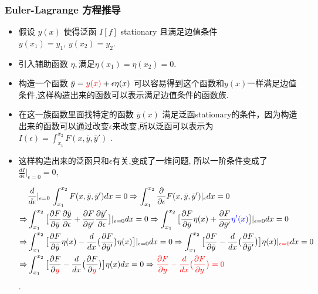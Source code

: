 \documentclass[UTF8, aspectratio=169, 9pt]{ctexbeamer}
\begin{document}
\begin{frame}
  \frametitle{Euler-Lagrange 方程推导}
  \begin{itemize}
  \item 假设 $y(x)$ 使得泛函 $I[f]$ stationary 且满足边值条件 $y(x_1) = y_1, \, y(x_2) = y_2$.
  \item 引入辅助函数 $\eta, 满足 \eta (x_1) = \eta (x_2) = 0$.
  \item 构造一个函数 $\bar{y} = \textcolor{red} {y(x)} + \epsilon \eta(x)$ 可以容易得到这个函数和$y(x)$一样满足边值条件,这样构造出来的函数可以表示满足边值条件的函数族.
  \item 在这一族函数里面找特定的函数 $\bar{y} (x)$ 满足泛函stationary的条件，因为构造出来的函数可以通过改变$\epsilon$来改变,所以泛函可以表示为 $I( \epsilon ) =
    \int_{x_1}^{x_2} F( x, \bar{y}, \bar{y}' )$ .
  \item 这样构造出来的泛函只和$\epsilon$有关,变成了一维问题, 所以一阶条件变成了
    $\frac{dI}{d \epsilon} |_{\epsilon = 0} = 0$,

    \begin{align}
      \begin{split}
        & \frac{d}{d \epsilon} |_{\epsilon = 0} \, \int_{x_1}^{x_2} F(x,
        \bar{y}, \bar{y}' ) dx = 0 \Rightarrow \int_{x_1}^{x_2}
        \frac{\partial}{\partial
          \epsilon} F( x, \bar{y}, \bar{y}' ) |_{\epsilon} dx = 0 \\
        \Rightarrow & \int_{x_1}^{x_2} \big [ \frac{ \partial F }{ \partial
          \bar{y} } \frac{ \partial \bar{y} }{ \partial \epsilon } + \frac{
          \partial F }{ \partial \bar{y}' } \frac{ \partial \bar{y}' }{ \partial
          \epsilon } \big ] |_{\epsilon=0} dx = 0
        \Rightarrow  \int_{x_1}^{x_2} \big [ \frac{ \partial F }{ \partial
          \bar{y} } \eta (x) + \frac{
          \partial F }{ \partial \bar{y}' } \textcolor {blue} {\eta'(x)} \big ] |_{\epsilon=0} dx =
        0 \\
        \Rightarrow & \int_{x_1}^{x_2} \big [ \frac{ \partial F }{ \partial
          \bar{y} } \eta (x) - \frac{d}{dx} \big ( \frac{
          \partial F }{ \partial \bar{y}' } \big ) \eta(x) \big ] |_{\epsilon=0} dx =
        0
        \Rightarrow  \int_{x_1}^{x_2} \big [ \frac{ \partial F }{ \partial
          \bar{y} }  - \frac{d}{dx} \big ( \frac{
          \partial F }{ \partial \bar{y}' } \big )  \big ] \eta(x) |_{\textcolor
          {red} {\epsilon=0} } dx =
        0  \\
        \Rightarrow & \int_{x_1}^{x_2} \big [ \frac{ \partial F }{ \partial
          \textcolor {red} {y} }  - \frac{d}{dx} \big ( \frac{
          \partial F }{ \partial \textcolor {red} {y} } \big )  \big ] \eta(x)  dx =
        0
        \Rightarrow \textcolor[rgb]{1.00,0.00,0.00}{ \frac{ \partial F }{ \partial
          {y} }  - \frac{d}{dx} \big ( \frac{
          \partial F }{ \partial  {y} } \big )  = 0 }
      \end{split}
    \end{align}.

  \end{itemize}
\end{frame}
\end{document}
